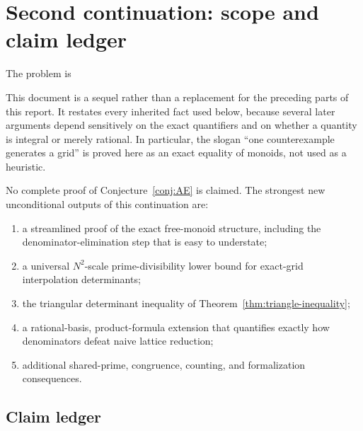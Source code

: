 \documentclass[11pt,oneside]{article}
\theoremstyle{definition}
\theoremstyle{remark}
\begin{document}
\clearpage

\section{Second continuation: scope and claim ledger}
\label{sec:continuation2}

The problem is


This document is a sequel rather than a replacement for the preceding parts of this report.  It restates every inherited fact used below, because several later
arguments depend sensitively on the exact quantifiers and on whether a
quantity is integral or merely rational.  In particular, the slogan ``one
counterexample generates a grid'' is proved here as an exact equality of
monoids, not used as a heuristic.

No complete proof of Conjecture~\ref{conj:AE} is claimed.  The strongest new
unconditional outputs of this continuation are:
\begin{enumerate}
\item a streamlined proof of the exact free-monoid structure, including the
      denominator-elimination step that is easy to understate;
\item a universal $N^2$-scale prime-divisibility lower bound for exact-grid
      interpolation determinants;
\item the triangular determinant inequality of
      Theorem~\ref{thm:triangle-inequality};
\item a rational-basis, product-formula extension that quantifies exactly how
      denominators defeat naive lattice reduction;
\item additional shared-prime, congruence, counting, and formalization
      consequences.
\end{enumerate}

\subsection{Claim ledger}
\end{document}
